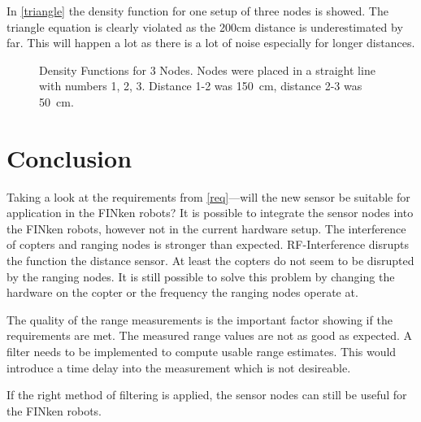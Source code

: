 In \autoref{triangle} the density function for one setup of three nodes is showed.
The triangle equation is clearly violated as the \si{200}{cm} distance is underestimated by far.
This will happen a lot as there is a lot of noise especially for longer distances.
\begin{figure}[H]
	\centering
	
	\caption[Density Functions for 3 Nodes]{Density Functions for 3 Nodes. Nodes were placed in a straight line with numbers 1, 2, 3. Distance 1-2 was \SI{150}{cm}, distance 2-3 was \SI{50}{cm}. }
	\label{triangle}
\end{figure}


\section{Conclusion}

Taking a look at the requirements from \autoref{req}—will the new sensor be suitable for application in the FINken robots?
It is possible to integrate the sensor nodes into the FINken robots, however not in the current hardware setup.
The interference of copters and ranging nodes is stronger than expected.
RF-Interference disrupts the function the distance sensor.
At least the copters do not seem to be disrupted by the ranging nodes.
It is still possible to solve this problem by changing the hardware on the copter or the frequency the ranging nodes operate at.

The quality of the range measurements is the important factor showing if the requirements are met.
The measured range values are not as good as expected.
A filter needs to be implemented to compute usable range estimates.
This would introduce a time delay into the measurement which is not desireable.

If the right method of filtering is applied, the sensor nodes can still be useful for the FINken robots.
